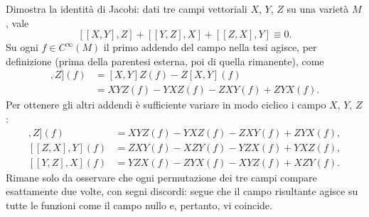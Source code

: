 \documentclass[a4paper]{article}
\begin{document}
\begin{ex}[4.3]{Dimostra la identità di Jacobi: dati tre campi vettoriali $ X $, $ Y $, $ Z $ su una varietà $ M $, vale
\[[[X, Y ], Z] + [[Y, Z], X] + [[Z, X], Y ] \equiv 0.\]}
	Su ogni $ f \in C^\infty(M) $ il primo addendo del campo nella tesi agisce, per definizione (prima della parentesi esterna, poi di quella rimanente), come
	\begin{align*}
		[[X, Y ], Z](f) & = [X, Y]Z(f) - Z[X, Y](f) \\
		& = XYZ(f) - YXZ(f) - ZXY(f) + ZYX(f).
	\end{align*}
	Per ottenere gli altri addendi è sufficiente variare in modo ciclico i campo $ X, \, Y, \, Z $:
	\begin{align*}
	[[X, Y ], Z](f) & = XYZ(f) - YXZ(f) - ZXY(f) + ZYX(f), \\
	[[Z, X ], Y](f) & = ZXY(f) - XZY(f) - YZX(f) + YXZ(f), \\
	[[Y, Z ], X](f) & = YZX(f) - ZYX(f) - XYZ(f) + XZY(f).
	\end{align*}
	Rimane solo da osservare che ogni permutazione dei tre campi compare esattamente due volte, con segni discordi: segue che il campo risultante agisce su tutte le funzioni come il campo nullo e, pertanto, vi coincide.
\end{ex}
\end{document}
